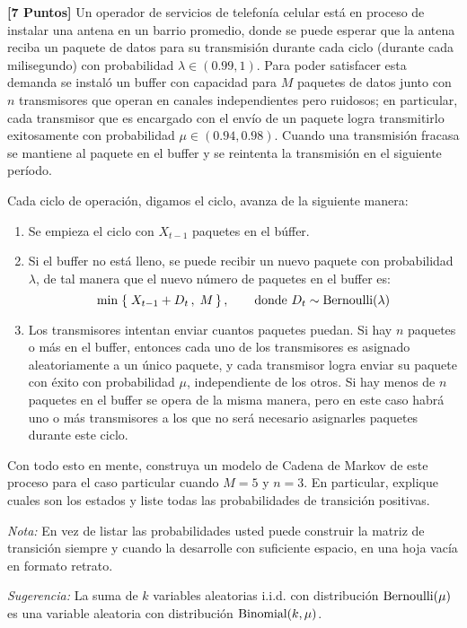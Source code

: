 \documentclass[ a4paper, twoside, 11pt]{article}
\begin{document}
\begin{problem}
\textbf{[7 Puntos]} Un operador de servicios de telefon\'ia celular est\'a en proceso de instalar una antena en un barrio promedio, donde se puede esperar que la antena reciba un paquete de datos para su transmisi\'on durante cada ciclo (\eg durante cada milisegundo) con probabilidad $\lambda \in (0.99,1)$. Para poder satisfacer esta demanda se instal\'o un buffer con capacidad para $M$ paquetes de datos junto con $n$ transmisores que operan en canales independientes pero ruidosos; en particular, cada transmisor que es encargado con el env\'io de un paquete logra transmitirlo exitosamente con probabilidad $\mu \in (0.94,0.98)$. Cuando una transmisi\'on fracasa se mantiene al paquete en el buffer y se reintenta la transmisi\'on en el siguiente per\'iodo. 

Cada ciclo de operaci\'on, digamos el \tavo ciclo, avanza de la siguiente manera: 
\begin{enumerate}
\item Se empieza el ciclo con $X_{t-1}$ paquetes en el b\'uffer. 
\item Si el buffer no est\'a lleno, se puede recibir un nuevo paquete con probabilidad $\lambda$, de tal manera que el nuevo n\'umero de paquetes en el buffer es: 
\[
\min \; \{ \; X_{t-1} + D_t \, , \; M \, \} \, ,
\qquad \text{donde } D_t \sim \text{Bernoulli}(\lambda)
\]
\item Los transmisores intentan enviar cuantos paquetes puedan. Si hay $n$ paquetes o m\'as en el buffer, entonces cada uno de los transmisores es asignado aleatoriamente a un \'unico paquete, y cada transmisor logra enviar su paquete con \'exito con probabilidad $\mu$, independiente de los otros. Si hay menos de $n$ paquetes en el buffer se opera de la misma manera, pero en este caso habr\'a uno o m\'as transmisores a los que no ser\'a necesario asignarles paquetes durante este ciclo. 
\end{enumerate}

Con todo esto en mente, construya un modelo de Cadena de Markov de este proceso para el caso particular cuando $M = 5$ y $n = 3$. En particular, explique cuales son los estados y liste todas las probabilidades de transici\'on positivas. 

\emph{Nota:} En vez de listar las probabilidades usted puede construir la matriz de transici\'on siempre y cuando la desarrolle con suficiente espacio, \eg en una hoja vac\'ia en formato retrato. 

\emph{Sugerencia:} La suma de $k$ variables aleatorias i.i.d. con distribuci\'on $\text{Bernoulli}(\mu)$ es una variable aleatoria con distribuci\'on $\text{Binomial}(k,\mu)$. 

\end{problem}
\vspace{\baselineskip}
\end{document}
